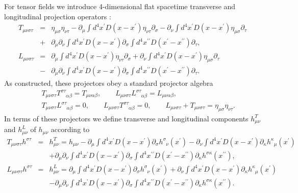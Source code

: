 \documentclass[aps,onecolumn,10pt]{revtex4}
\numberwithin{equation}{section}
\numberwithin{equation}{section}
\begin{document}
For tensor fields we introduce 4-dimensional flat  spacetime transverse and longitudinal projection operators \cite{Mannheim2005,Amarasinghe2018}: 
%
\begin{eqnarray}
T_{\mu\nu\sigma\tau}&=&\eta_{\mu\sigma}\eta_{\nu\tau}
-\partial_{\mu}\int d^4x^{\prime}D(x-x^{\prime})
\eta_{\nu\tau}\partial_{\sigma}
-\partial_{\nu}\int d^4x^{\prime}D(x-x^{\prime})
\eta_{\mu\sigma}\partial_{\tau}
\nonumber \\
&+&\partial_{\mu}\partial_{\nu}\int
d^4x^{\prime}D(x-x^{\prime})\partial_{\sigma}\int
d^4x^{\prime\prime}D(x^{\prime}-x^{\prime\prime})
\partial_{\tau},
\nonumber\\
L_{\mu\nu\sigma\tau}&=&\partial_{\mu}\int d^4x^{\prime}D(x-x^{\prime})
\eta_{\nu\tau}\partial_{\sigma}
+\partial_{\nu}\int d^4x^{\prime}D(x-x^{\prime})
\eta_{\mu\sigma}\partial_{\tau}
\nonumber \\
&-&\partial_{\mu}\partial_{\nu}\int
d^4x^{\prime}D(x-x^{\prime})\partial_{\sigma}\int
d^4x^{\prime\prime}D(x^{\prime}-x^{\prime\prime})
\partial_{\tau}.
\label{A.9a}
\end{eqnarray}
%
As constructed, these projectors obey a standard projector algebra
%
\begin{eqnarray}
&&T_{\mu\nu\sigma\tau}T^{\sigma\tau}_{\phantom{\sigma\tau}\alpha\beta}=
T_{\mu\nu\alpha\beta},\qquad
L_{\mu\nu\sigma\tau}L^{\sigma\tau}_{\phantom{\sigma\tau}\alpha\beta}
=L_{\mu\nu\alpha\beta},
\nonumber \\
&&T_{\mu\nu\sigma\tau}L^{\sigma\tau}_{\phantom{\sigma\tau}\alpha\beta}=
0,\qquad
L_{\mu\nu\sigma\tau}T^{\sigma\tau}_{\phantom{\sigma\tau}\alpha\beta}
=0,\qquad L_{\mu\nu\sigma\tau}
+T_{\mu\nu\sigma\tau}
=\eta_{\mu\sigma}\eta_{\nu\tau}.
\label{A.10a}
\end{eqnarray}
% 
In terms of these projectors we define transverse and longitudinal components $h^{T}_{\mu\nu}$ and $h^{L}_{\mu\nu}$ of $h_{\mu\nu}$ according to
% 
\begin{eqnarray}
T_{\mu\nu\sigma\tau}h^{\sigma\tau}&=&h^{T}_{\mu\nu}=h_{\mu\nu}
-\partial_{\mu}\int
d^4x^{\prime}D(x-x^{\prime})\partial_{\sigma}
h^{\sigma}_{\phantom{\sigma}\nu}(x^{\prime}) 
-\partial_{\nu}\int d^4x^{\prime}D(x-x^{\prime})
\partial_{\kappa}h^{\kappa}_{\phantom{\kappa}\mu}(x^{\prime})
\nonumber \\
&&+\partial_{\mu}\partial_{\nu}\int
d^4x^{\prime}D(x-x^{\prime})\partial_{\sigma}\int
d^4x^{\prime\prime}D(x^{\prime}-x^{\prime\prime})
\partial_{\kappa}h^{\sigma\kappa}(x^{\prime\prime}),
\nonumber\\
L_{\mu\nu\sigma\tau}h^{\sigma\tau}&=&h^{L}_{\mu\nu}=\partial_{\mu}\int
d^4x^{\prime}D(x-x^{\prime})\partial_{\sigma}
h^{\sigma}_{\phantom{\sigma}\nu}(x^{\prime}) 
+\partial_{\nu}\int d^4x^{\prime}D(x-x^{\prime})
\partial_{\kappa}h^{\kappa}_{\phantom{\kappa}\mu}(x^{\prime})
\nonumber \\
&&-\partial_{\mu}\partial_{\nu}\int
d^4x^{\prime}D(x-x^{\prime})\partial_{\sigma}\int
d^4x^{\prime\prime}D(x^{\prime}-x^{\prime\prime})
\partial_{\kappa}h^{\sigma\kappa}(x^{\prime\prime}).
\label{A.11a}
\end{eqnarray}
\end{document}
